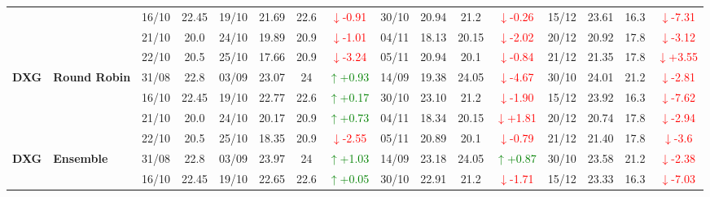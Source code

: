 \documentclass{ieeeaccess}
\begin{document}
{\begin{longtable}{llcc|cccc|cccc|cccc}
& 
& 16/10 & 22.45 & 19/10 & 21.69 & 22.6 & \textcolor{red}{\(\downarrow\)-0.91} & 30/10 & 20.94 & 21.2 & \textcolor{red}{\(\downarrow\)-0.26} & 15/12 & 23.61 & 16.3 & \textcolor{red}{\(\downarrow\)-7.31} \\

& 
& 21/10 & 20.0 & 24/10 & 19.89 & 20.9 & \textcolor{red}{\(\downarrow\)-1.01} & 04/11 & 18.13 & 20.15 & \textcolor{red}{\(\downarrow\)-2.02} & 20/12 & 20.92 & 17.8 & \textcolor{red}{\(\downarrow\)-3.12} \\

&
& 22/10 & 20.5 & 25/10 & 17.66 & 20.9 & \textcolor{red}{\(\downarrow\)-3.24} & 05/11 & 20.94 & 20.1 & \textcolor{red}{\(\downarrow\)-0.84} & 21/12 & 21.35 & 17.8 & \textcolor{red}{\(\downarrow\)+3.55} \\
\midrule


\multirow{4}{*}{\textbf{DXG}} 
& \textbf{Round Robin}
& 31/08 & 22.8 & 03/09 & 23.07 & 24 & \textcolor{green}{\(\uparrow\)+0.93} & 14/09 & 19.38 & 24.05 & \textcolor{red}{\(\downarrow\)-4.67} & 30/10 & 24.01 & 21.2 & \textcolor{red}{\(\downarrow\)-2.81} \\

&
& 16/10 & 22.45 & 19/10 & 22.77 & 22.6 & \textcolor{green}{\(\uparrow\)+0.17} & 30/10 & 23.10 & 21.2 & \textcolor{red}{\(\downarrow\)-1.90} & 15/12 & 23.92 & 16.3 & \textcolor{red}{\(\downarrow\)-7.62} \\

&
& 21/10 & 20.0 & 24/10 & 20.17 & 20.9 & \textcolor{green}{\(\uparrow\)+0.73} & 04/11 & 18.34 & 20.15 & \textcolor{red}{\(\downarrow\)+1.81} & 20/12 & 20.74 & 17.8 & \textcolor{red}{\(\downarrow\)-2.94} \\

&
& 22/10 & 20.5 & 25/10 & 18.35 & 20.9 & \textcolor{red}{\(\downarrow\)-2.55} & 05/11 & 20.89 & 20.1 & \textcolor{red}{\(\downarrow\)-0.79} & 21/12 & 21.40 & 17.8 & \textcolor{red}{\(\downarrow\)-3.6} \\
\midrule


\multirow{4}{*}{\textbf{DXG}} 
& \textbf{Ensemble}
& 31/08 & 22.8 & 03/09 & 23.97 & 24 & \textcolor{green}{\(\uparrow\)+1.03} & 14/09 & 23.18 & 24.05 & \textcolor{green}{\(\uparrow\)+0.87} & 30/10 & 23.58 & 21.2 & \textcolor{red}{\(\downarrow\)-2.38} \\

&
& 16/10 & 22.45 & 19/10 & 22.65 & 22.6 & \textcolor{green}{\(\uparrow\)+0.05} & 30/10 & 22.91 & 21.2 & \textcolor{red}{\(\downarrow\)-1.71} & 15/12 & 23.33 & 16.3 & \textcolor{red}{\(\downarrow\)-7.03} \\


\end{longtable}}
\end{document}
